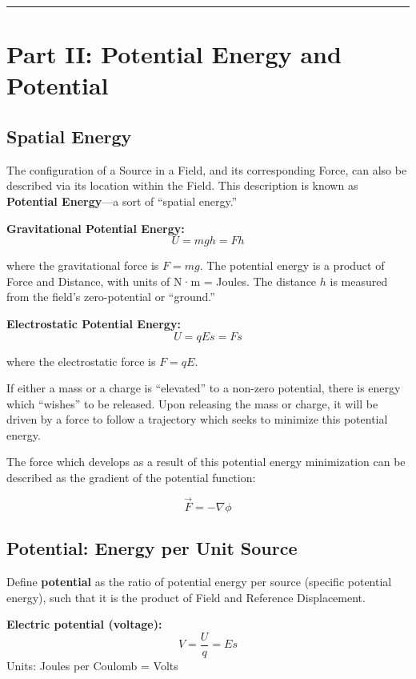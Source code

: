 \documentclass[
]{article}
\begin{document}
\begin{center}\rule{0.5\linewidth}{0.5pt}\end{center}

\section{Part II: Potential Energy and
Potential}\label{part-ii-potential-energy-and-potential}

\subsection{Spatial Energy}\label{spatial-energy}

The configuration of a Source in a Field, and its corresponding Force,
can also be described via its location within the Field. This
description is known as \textbf{Potential Energy}---a sort of ``spatial
energy.''

\textbf{Gravitational Potential Energy:} \[U = mgh = Fh\]

where the gravitational force is \(F = mg\). The potential energy is a
product of Force and Distance, with units of N·m = Joules. The distance
\(h\) is measured from the field's zero-potential or ``ground.''

\textbf{Electrostatic Potential Energy:} \[U = qEs = Fs\]

where the electrostatic force is \(F = qE\).

If either a mass or a charge is ``elevated'' to a non-zero potential,
there is energy which ``wishes'' to be released. Upon releasing the mass
or charge, it will be driven by a force to follow a trajectory which
seeks to minimize this potential energy.

The force which develops as a result of this potential energy
minimization can be described as the gradient of the potential function:

\[\vec{F} = -\nabla\phi\]

\subsection{Potential: Energy per Unit
Source}\label{potential-energy-per-unit-source}

Define \textbf{potential} as the ratio of potential energy per source
(specific potential energy), such that it is the product of Field and
Reference Displacement.

\textbf{Electric potential (voltage):} \[V = \frac{U}{q} = Es\] Units:
Joules per Coulomb = Volts
\end{document}
